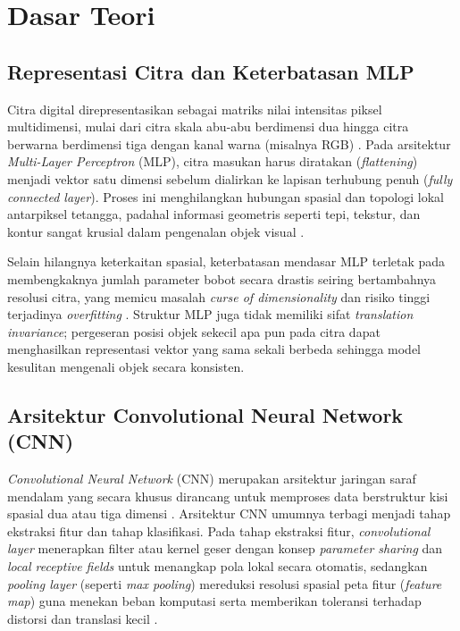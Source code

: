 \documentclass[12pt, a4paper]{article}
\begin{document}
\section{Dasar Teori}
\subsection{Representasi Citra dan Keterbatasan MLP}
Citra digital direpresentasikan sebagai matriks nilai intensitas piksel multidimensi, mulai dari citra skala abu-abu berdimensi dua hingga citra berwarna berdimensi tiga dengan kanal warna (misalnya RGB) \cite{lecun1998gradient}. Pada arsitektur \textit{Multi-Layer Perceptron} (MLP), citra masukan harus diratakan (\textit{flattening}) menjadi vektor satu dimensi sebelum dialirkan ke lapisan terhubung penuh (\textit{fully connected layer}). Proses ini menghilangkan hubungan spasial dan topologi lokal antarpiksel tetangga, padahal informasi geometris seperti tepi, tekstur, dan kontur sangat krusial dalam pengenalan objek visual \cite{gu2018recent}.

Selain hilangnya keterkaitan spasial, keterbatasan mendasar MLP terletak pada membengkaknya jumlah parameter bobot secara drastis seiring bertambahnya resolusi citra, yang memicu masalah \textit{curse of dimensionality} dan risiko tinggi terjadinya \textit{overfitting} \cite{lecun1998gradient}. Struktur MLP juga tidak memiliki sifat \textit{translation invariance}; pergeseran posisi objek sekecil apa pun pada citra dapat menghasilkan representasi vektor yang sama sekali berbeda sehingga model kesulitan mengenali objek secara konsisten.

\subsection{Arsitektur Convolutional Neural Network (CNN)}
\textit{Convolutional Neural Network} (CNN) merupakan arsitektur jaringan saraf mendalam yang secara khusus dirancang untuk memproses data berstruktur kisi spasial dua atau tiga dimensi \cite{lecun1998gradient, alzubaidi2021review}. Arsitektur CNN umumnya terbagi menjadi tahap ekstraksi fitur dan tahap klasifikasi. Pada tahap ekstraksi fitur, \textit{convolutional layer} menerapkan filter atau kernel geser dengan konsep \textit{parameter sharing} dan \textit{local receptive fields} untuk menangkap pola lokal secara otomatis, sedangkan \textit{pooling layer} (seperti \textit{max pooling}) mereduksi resolusi spasial peta fitur (\textit{feature map}) guna menekan beban komputasi serta memberikan toleransi terhadap distorsi dan translasi kecil \cite{gu2018recent}.
\end{document}
